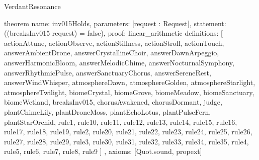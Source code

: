 \begin{lexlean}{VerdantResonance}
\begin{semanticmodule}
theorem{
  name: inv015Holds,
  parameters: [request : Request],
  statement: ((breaksInv015 request) = false),
  proof: linear_arithmetic{
    definitions: [
      actionAttune,
      actionObserve,
      actionStillness,
      actionStroll,
      actionTouch,
      answerAmbientDrone,
      answerCrystallineChoir,
      answerDawnArpeggio,
      answerHarmonicBloom,
      answerMelodicChime,
      answerNocturnalSymphony,
      answerRhythmicPulse,
      answerSanctuaryChorus,
      answerSereneRest,
      answerWindWhisper,
      atmosphereDawn,
      atmosphereGolden,
      atmosphereStarlight,
      atmosphereTwilight,
      biomeCrystal,
      biomeGrove,
      biomeMeadow,
      biomeSanctuary,
      biomeWetland,
      breaksInv015,
      chorusAwakened,
      chorusDormant,
      judge,
      plantChimeLily,
      plantDroneMoss,
      plantEchoLotus,
      plantPulseFern,
      plantStarOrchid,
      rule1,
      rule10,
      rule11,
      rule12,
      rule13,
      rule14,
      rule15,
      rule16,
      rule17,
      rule18,
      rule19,
      rule2,
      rule20,
      rule21,
      rule22,
      rule23,
      rule24,
      rule25,
      rule26,
      rule27,
      rule28,
      rule29,
      rule3,
      rule30,
      rule31,
      rule32,
      rule33,
      rule34,
      rule35,
      rule4,
      rule5,
      rule6,
      rule7,
      rule8,
      rule9
    ]
  },
  axioms: [Quot.sound, propext]
}
\end{semanticmodule}
\end{lexlean}
